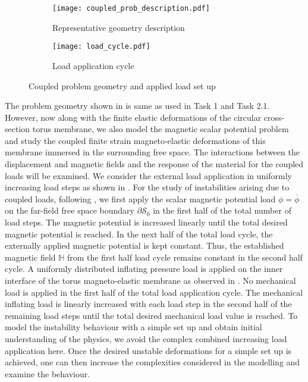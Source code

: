 \begin{figure}[h]
\centering
\begin{subfigure}{0.55\textwidth}
\centering
\texttt{[image: coupled\_prob\_description.pdf]}
\caption{Representative geometry description}
\label{fig:3.6.1}
\end{subfigure}
\begin{subfigure}{0.44\textwidth}
\centering
\texttt{[image: load\_cycle.pdf]}
\caption{Load application cycle}
\label{fig:3.6.2}
\end{subfigure}
\caption{Coupled problem geometry and applied load set up}
\label{fig:3.6}
\end{figure}

The problem geometry shown in  is same as used in Task 1 and Task 2.1. However, now along with the finite elastic deformations of the circular cross-section torus membrane, we also model the magnetic scalar potential problem and study the coupled finite strain magneto-elastic deformations of this membrane immersed in the surrounding free space. The interactions between the displacement and magnetic fields and the response of the material for the coupled loads will be examined. We consider the external load application in uniformly increasing load steps as shown in . For the study of instabilities arising due to coupled loads, following \cite{reddy_toroid}, we first apply the scalar magnetic potential load $\phi = \overline{\phi}$ on the far-field free space boundary $\partial \mathcal{S}_0$ in the first half of the total number of load steps. The magnetic potential is increased linearly until the total desired magnetic potential is reached. In the next half of the total load cycle, the externally applied magnetic potential is kept constant. Thus, the established magnetic field $\mathbb{H}$ from the first half load cycle remains constant in the second half cycle. A uniformly distributed inflating pressure load is applied on the inner interface of the torus magneto-elastic membrane as observed in . No mechanical load is applied in the first half of the total load application cycle. The  mechanical inflating load is linearly increased with each load step in the second half of the remaining load steps until the total desired mechanical load value is reached. To model the instability behaviour with a simple set up and obtain initial understanding of the physics, we avoid the complex combined increasing load application here. Once the desired unstable deformations for a simple set up is achieved, one can then increase the complexities considered in the modelling and examine the behaviour. 

